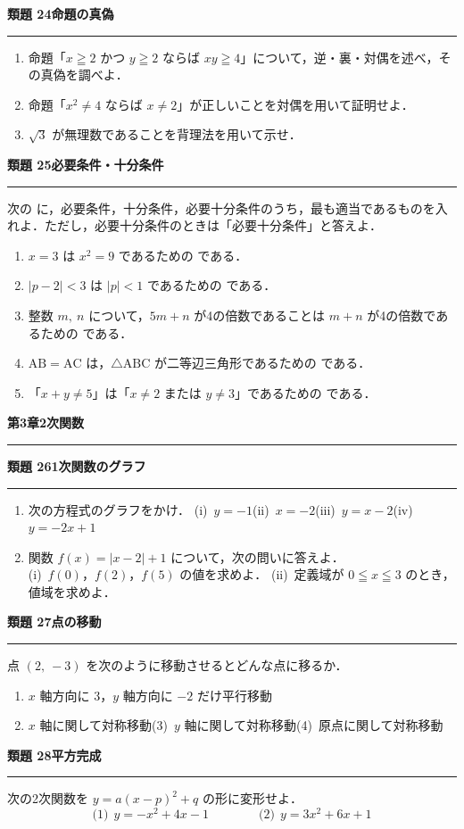 \documentclass[a4paper,11pt]{ltjsarticle}
\newcommand{\mon}[2]{\Needspace{7\baselineskip}\vspace{10pt}%
  {\sffamily\bfseries 類題 #1\quad #2\par}\vspace{2pt}\hrule\vspace{4pt}}
\newcommand{\shou}[2]{\clearpage\markboth{#1\quad #2}{}%
  {\sffamily\bfseries\LARGE #1\quad #2\par}\vspace{2pt}\hrule height 1.2pt\vspace{4pt}}
\begin{document}
\mon{24}{命題の真偽}
\begin{enumerate}
\item 命題「$x\geqq2$ かつ $y\geqq2$ ならば $xy\geqq4$」について，逆・裏・対偶を述べ，その真偽を調べよ．
\item 命題「$x^2\neq4$ ならば $x\neq2$」が正しいことを対偶を用いて証明せよ．
\item $\sqrt3$ が無理数であることを背理法を用いて示せ．
\end{enumerate}

\mon{25}{必要条件・十分条件}
次の \fbox{\phantom{あ}} に，必要条件，十分条件，必要十分条件のうち，最も適当であるものを入れよ．ただし，必要十分条件のときは「必要十分条件」と答えよ．
\begin{enumerate}
\item $x=3$ は $x^2=9$ であるための \fbox{\phantom{あ}} である．
\item $|p-2|<3$ は $|p|<1$ であるための \fbox{\phantom{あ}} である．
\item 整数 $m,\ n$ について，$5m+n$ が4の倍数であることは $m+n$ が4の倍数であるための \fbox{\phantom{あ}} である．
\item $\mathrm{AB}=\mathrm{AC}$ は，$\triangle\mathrm{ABC}$ が二等辺三角形であるための \fbox{\phantom{あ}} である．
\item 「$x+y\neq5$」は「$x\neq2$ または $y\neq3$」であるための \fbox{\phantom{あ}} である．
\end{enumerate}

\shou{第3章}{2次関数}
\mon{26}{1次関数のグラフ}
\begin{enumerate}
\item 次の方程式のグラフをかけ．\quad
(i)\ $y=-1$\qquad (ii)\ $x=-2$\qquad (iii)\ $y=x-2$\qquad (iv)\ $y=-2x+1$
\item 関数 $f(x)=|x-2|+1$ について，次の問いに答えよ．\\
(i)\ $f(0)$，$f(2)$，$f(5)$ の値を求めよ．\qquad
(ii)\ 定義域が $0\leqq x\leqq3$ のとき，値域を求めよ．
\end{enumerate}

\mon{27}{点の移動}
点 $(2,\ -3)$ を次のように移動させるとどんな点に移るか．
\begin{enumerate}
\item $x$ 軸方向に $3$，$y$ 軸方向に $-2$ だけ平行移動
\item $x$ 軸に関して対称移動\qquad (3)\ $y$ 軸に関して対称移動\qquad (4)\ 原点に関して対称移動
\end{enumerate}

\mon{28}{平方完成}
次の2次関数を $y=a(x-p)^2+q$ の形に変形せよ．
\[\text{(1)}\ \ y=-x^2+4x-1\qquad\qquad\text{(2)}\ \ y=3x^2+6x+1\]
\end{document}
